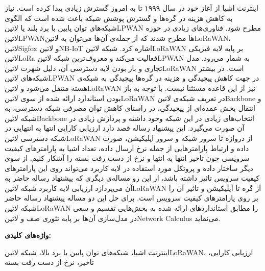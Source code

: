 \newpage\clearpage

\pagestyle{abstract}

\vspace*{-1cm}
\section*{\centering \abstractname}
\vspace*{.5cm}

اینترنت اشیا از آغاز خود در سال ۱۹۹۹ تا به امروز گسترش زیادی پیدا کرده است.
نیاز به کاهش هزینه در گره‌ها و گسترش پوشش شبکه باعث شده است که الگوی
شبکه‌های توان پایین با برد بلند یا
‌لاتین{LPWAN} مطرح شود.
فناوری‌های زیادی در حوزه ‌لاتین{LPWAN}ها مطرح شدند که از جمله‌ی آن‌ها می‌توان به ‌لاتین{LoRaWAN}، ‌لاتین{Sigfox} و ‌لاتین{NB-IoT}
اشاره کرد. شبکه ‌لاتین{LoRaWAN} بر پایه لایه فیزیکی ‌لاتین{LoRa} فعالیت می‌کند و
معروف‌ترین شبکه ‌لاتین{LPWAN} به شمار می‌رود. مدل تجاری و باز بودن
لایه دسترسی آن، دلیل شهرت ‌لاتین{LoRaWAN} است.
در بیشتر شبکه‌های ‌لاتین{LPWAN} در جهت کاهش پیچیدگی و هزینه در گره‌ها پیچیدگی به شبکه‌ی هسته منتقل می‌شود و ‌لاتین{LoRaWAN}
نیز از این قاعده مستثنا نیست.
با توجه به باز بودن استاندارد ارائه شده از سوی ‌لاتین{LoRaWAN} در تعریف شبکه‌ی ‌لاتین{Backbone} و
انتقال بخش عمده‌ای از پیچیدگی، در راستای کاهش توان مصرفی
شبکه دسترسی، به شبکه ‌لاتین{Backbone} انتخاب‌های زیادی در این شبکه وجود داشته و پردازش زیادی در آن صورت می‌گیرد.
این پیشنهاد رساله قصد دارد ارزیابی کارایی انتها به انتهایی در شبکه دسترسی ‌لاتین{LoRaWAN}
از دروازه تا سرور شبکه و سرور اپلیکیشن،
صورت داده و ارتباط پارامترهایی از جمله نرخ ارسال داده، تعداد اشیا
به پارامترهای کیفیت سرویسی چون تاخیر انتها به انتها و نرخ از دست رفت بسته را آشکار کنیم.
از سوی دیگر ساختار داده و پروتکل مورد استفاده در لایه کاربرد می‌تواند روی این پارامترهای کیفیت سرویس تاثیر داشته باشد،
از این رو مساله‌ی دیگری که پیشنهاد رساله حاضر به آن می‌پردازد
ارزیابی لایه کاربرد شبکه ‌لاتین{LoRaWAN} از گره تا اپلیکیشن
و تاثیر آن را بر روی پارامترهای کیفیت سرویس است.
برای حل این دو مساله پیشنهاد رساله حاضر شبکه ‌لاتین{LoRaWAN} را
مطابق استانداردهای ارائه شده
به بخش‌هایی تقسیم و سعی در مدل‌سازی آن‌ها بر پایه تئوری صف و ‌لاتین{Network Calculus}
می‌نماید.

\vspace*{2cm}

{%
  \noindent\large\textbf{واژه‌های کلیدی:}
}\par
\vspace*{.5cm}
اینترنت اشیا، شبکه‌های توان پایین با برد بالا، شبکه ‌لاتین{LoRaWAN}، ارزیابی کارایی، تاخیر، نرخ از دست رفت بسته
